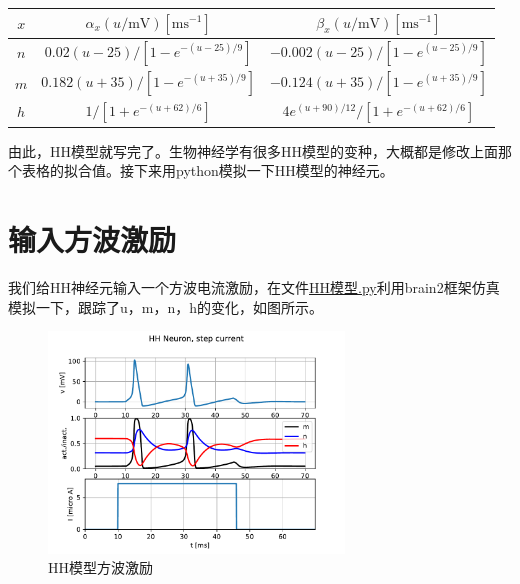 \documentclass[12pt, a4paper, oneside]{ctexbook}
\begin{document}
\begin{tabular}{ccc}
    \hline$x$ & $\alpha_x(u / \mathrm{mV})\left[\mathrm{ms}^{-1}\right]$ & $\beta_x(u / \mathrm{mV})\left[\mathrm{ms}^{-1}\right]$ \\
    \hline$n$ & $0.02(u-25) /\left[1-e^{-(u-25) / 9}\right]$ & $-0.002(u-25) /\left[1-e^{(u-25) / 9}\right]$ \\
    $m$ & $0.182(u+35) /\left[1-e^{-(u+35) / 9}\right]$ & $-0.124(u+35) /\left[1-e^{(u+35) / 9}\right]$ \\
    $h$ & $1 /\left[1+e^{-(u+62) / 6}\right]$ & $4 e^{(u+90) / 12} /\left[1+e^{-(u+62) / 6}\right]$ \\
    \hline
\end{tabular}

由此，HH模型就写完了。生物神经学有很多HH模型的变种，大概都是修改上面那个表格的拟合值。接下来用python模拟一下HH模型的神经元。

\section{输入方波激励}

我们给HH神经元输入一个方波电流激励，在文件\href{./python仿真代码/HH模型.py}{HH模型.py}利用brain2框架仿真模拟一下，跟踪了u，m，n，h的变化，如图所示。

\begin{figure}[H]
    \centering
    \includegraphics[width=0.7\textwidth]{HH模型方波激励.pdf}
    \caption{HH模型方波激励}
\end{figure}
\end{document}

